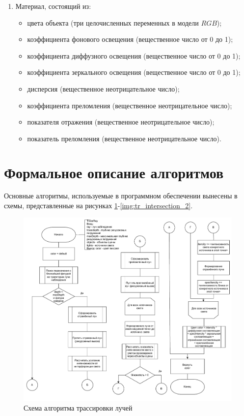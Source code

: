 \begin{enumerate}[label={\arabic*)}]
	\item Материал, состоящий из:
    \begin{itemize}[label=---]
		\item цвета объекта (три целочисленных переменных в модели $RGB$);
		\item коэффициента фонового освещения (вещественное число от 0 до 1);
		\item коэффициента диффузного освещения (вещественное число от 0 до 1);
		\item коэффициента зеркального освещения (вещественное число от 0 до 1);
		\item дисперсия (вещественное неотрицательное число);
		\item коэффициента преломления (вещественное неотрицательное число);
        \item показателя отражения (вещественное неотрицательное число);
		\item показатель преломления (вещественное неотрицательное число).
	\end{itemize}
\end{enumerate}

\section{Формальное описание алгоритмов}

Основные алгоритмы, используемые в программном обеспечении вынесены в схемы, представленные на рисунках \ref{img:trace_ray}-\ref{img:tr_intersection_2}.

\begin{figure}[H]
	\begin{center}
		\includegraphics[width=\linewidth]{img/trace_ray.pdf}
	\end{center}
	\captionsetup{justification=centering}
	\caption{Схема алгоритма трассировки лучей}
	\label{img:trace_ray}
\end{figure}

